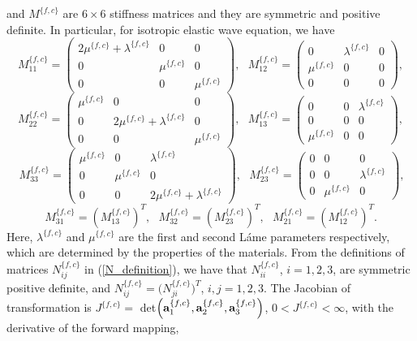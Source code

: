 and $M^{\{f,c\}}$ are $6\times 6$ stiffness matrices and they are symmetric and positive definite. In particular, for isotropic elastic wave equation, we have
\[ M_{11}^{\{f,c\}} = \left(\begin{array}{ccc}
2\mu^{\{f,c\}}+\lambda^{\{f,c\}} & 0 & 0\\
0 & \mu^{\{f,c\}} & 0\\
0 & 0 & \mu^{\{f,c\}}\end{array}\right),\ \ \  M_{12}^{\{f,c\}} = \left(\begin{array}{ccc}
0 & \lambda^{\{f,c\}} & 0\\
\mu^{\{f,c\}} & 0 & 0\\
0 & 0 & 0\end{array}\right), \]
\begin{equation}\label{M_definition}
M_{22}^{\{f,c\}} = \left(\begin{array}{ccc}
\mu^{\{f,c\}} & 0 & 0\\
0 & 2\mu^{\{f,c\}}+\lambda^{\{f,c\}} & 0\\
0 & 0 & \mu^{\{f,c\}}\end{array}\right),\ \ \ M_{13}^{\{f,c\}} = \left(\begin{array}{ccc}
0 & 0 & \lambda^{\{f,c\}}\\
0 & 0 & 0\\
\mu^{\{f,c\}} & 0 & 0\end{array}\right),
\end{equation}
\[\ M_{33}^{\{f,c\}} = \left(\begin{array}{ccc}
\mu^{\{f,c\}} & 0 & \lambda^{\{f,c\}}\\
0 & \mu^{\{f,c\}} & 0\\
0 & 0 & 2\mu^{\{f,c\}}+\lambda^{\{f,c\}}\end{array}\right),\ \ \ M_{23}^{\{f,c\}} = \left(\begin{array}{ccc}
0 & 0 & 0\\
0 & 0 & \lambda^{\{f,c\}}\\
0 & \mu^{\{f,c\}} & 0\end{array}\right),\]
\[ M_{31}^{\{f,c\}} = (M_{13}^{\{f,c\}})^T, \ \ \  M_{32}^{\{f,c\}} =(M_{23}^{\{f,c\}})^T, \ \ \ M_{21}^{\{f,c\}} =(M_{12}^{\{f,c\}})^T.\]
Here, $\lambda^{\{f,c\}}$ and $\mu^{\{f,c\}}$ are the first and second L{\' {a}}me parameters respectively, which are determined by the properties of the materials. From the definitions of matrices $N_{ij}^{\{f,c\}}$ in (\ref{N_definition}), we have that $N_{ii}^{\{f,c\}}$, $i = 1,2,3$, are symmetric positive definite, and $N_{ij}^{\{f,c\}}=\big(N_{ji}^{\{f,c\}}\big)^T$, $i,j=1,2,3$. The Jacobian of transformation is $J^{\{f,c\}} =$ det$\left({\bf a}^{\{f,c\}}_1,{\bf a}^{\{f,c\}}_2,{\bf a}^{\{f,c\}}_3\right)$, $0<J^{\{f,c\}}<\infty$, with the derivative of the forward mapping, 
